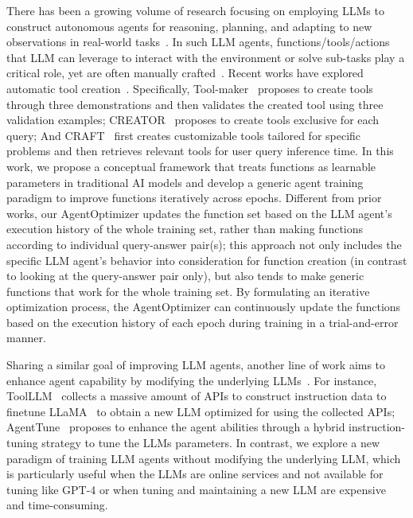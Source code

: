 \documentclass{article}
\theoremstyle{plain}
\theoremstyle{definition}
\theoremstyle{remark}
\begin{document}
There has been a growing volume of research focusing on employing LLMs to construct autonomous agents for reasoning, planning, and adapting to new observations in real-world tasks~\cite{xi2023rise, wang2023survey, hong2023metagpt, yao2022react, wu2023autogen, li2023camel, babyagi, park2023generative}. 
In such LLM agents, functions/tools/actions that LLM can leverage to interact with the environment or solve sub-tasks play a critical role, yet are often manually crafted~\cite{yao2022react}.
Recent works have explored automatic tool creation~\cite{cai2023large, qian2023creator,yuan2023craft}.
Specifically, Tool-maker~\cite{cai2023large} proposes to create tools through three demonstrations and then validates the created tool using three validation examples; CREATOR~\cite{qian2023creator} proposes to create tools exclusive for each query; 
And CRAFT~\cite{yuan2023craft} first creates customizable tools tailored for specific problems and then retrieves relevant tools for user query inference time.
In this work, we propose a conceptual framework that treats functions as learnable parameters in traditional AI models and develop a generic agent training paradigm to improve functions iteratively across epochs.
Different from prior works, our AgentOptimizer updates the function set based on the LLM agent's execution history of the whole training set, rather than making functions according to individual query-answer pair(s); this approach not only includes the specific LLM agent's behavior into consideration for function creation (in contrast to looking at the query-answer pair only), but also tends to make generic functions that work for the whole training set. By formulating an iterative optimization process, the AgentOptimizer can continuously update the functions based on the execution history of each epoch during training in a trial-and-error manner.


Sharing a similar goal of improving LLM agents, another line of work aims to enhance agent capability by modifying the underlying LLMs~\cite{patil2023gorilla,qin2023toolllm,zeng2023agenttuning}.
For instance, ToolLLM~\cite{qin2023toolllm} collects a massive amount of APIs to construct instruction data to finetune LLaMA~\cite{touvron2023llama} to obtain a new LLM optimized for using the collected APIs;
AgentTune~\cite{zeng2023agenttuning} proposes to enhance the
agent abilities through a hybrid instruction-tuning strategy to tune the LLMs parameters.
In contrast, we explore a new paradigm of training LLM agents without modifying the underlying LLM, which is particularly useful when the LLMs are online services and not available for tuning like GPT-4 or when tuning and maintaining a new LLM are expensive and time-consuming. 
\end{document}
